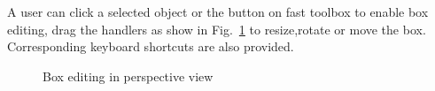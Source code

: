 \documentclass[letterpaper, 10 pt, conference]{ieeeconf}  %
\begin{document}
A user can click a selected object or the button on fast toolbox to enable box editing, drag the handlers as show in Fig.~\ref{fig:box-mouse-edit} to resize,rotate or move the box. Corresponding keyboard shortcuts are also provided.
 

\begin{figure}[t]
	\centering
	\caption{Box editing in perspective view}
	\label{fig:box-mouse-edit}
\end{figure}
\end{document}
